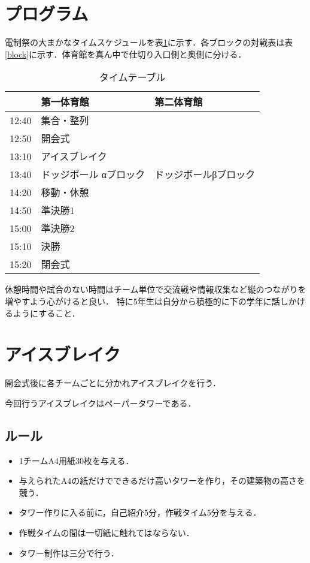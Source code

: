 \documentclass[dvipdfmx]{jsarticle}
\begin{document}
\section{プログラム}
電制祭の大まかなタイムスケジュールを表\ref{time}に示す．各ブロックの対戦表は表\ref{block}に示す．体育館を真ん中で仕切り入口側と奥側に分ける．
\begin{table}[H]

  \caption{タイムテーブル}
  \label{time}
  \centering
  \begin{tabular}{l||l|l}
          & 第一体育館        & 第二体育館       \\\hline\hline
    12:40 & 集合・整列        &             \\
    12:50 & 開会式          &             \\
    13:10 & アイスブレイク      &             \\
    13:40 & ドッジボール αブロック & ドッジボールβブロック \\
    14:20 & 移動・休憩        &             \\
    14:50 & 準決勝1         &             \\
    15:00 & 準決勝2         &             \\
    15:10 & 決勝           &             \\
    15:20 & 閉会式          &
  \end{tabular}
\end{table}
休憩時間や試合のない時間はチーム単位で交流戦や情報収集など縦のつながりを増やすよう心がけると良い．
特に5年生は自分から積極的に下の学年に話しかけるようにすること．

\section{アイスブレイク}
開会式後に各チームごとに分かれアイスブレイクを行う．

今回行うアイスブレイクはペーパータワーである．
\subsection{ルール}
\begin{itemize}
  \item 1チームA4用紙30枚を与える．
  \item 与えられたA4の紙だけでできるだけ高いタワーを作り，その建築物の高さを競う．
  \item タワー作りに入る前に，自己紹介5分，作戦タイム5分を与える．
  \item 作戦タイムの間は一切紙に触れてはならない．
  \item タワー制作は三分で行う．
\end{itemize}
\end{document}
